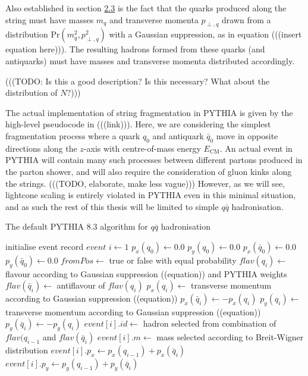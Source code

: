 \documentclass[12pt,a4paper]{report}
\begin{document}
Also established in section \hyperref[sec:lsm]{2.3} is the fact that the quarks produced along the string must have masses $m_q$ and transverse momenta $p_{\perp,q}$ drawn from a distribution $\text{Pr}(m_q^2, p_{\perp,q}^2)$ with a Gaussian suppression, as in equation (((insert equation here))). The resulting hadrons formed from these quarks (and antiquarks) must have masses and transverse momenta distributed accordingly.

(((TODO: Is this a good description? Is this necessary? What about the distribution of $N$?)))

The actual implementation of string fragmentation in PYTHIA is given by the high-level pseudocode in (((link))). Here, we are considering the simplest fragmentation process where a quark $q_0$ and antiquark $\bar{q}_0$ move in opposite directions along the $z$-axis with centre-of-mass energy $E_\text{CM}$. An actual event in PYTHIA will contain many such processes between different partons produced in the parton shower, and will also require the consideration of gluon kinks along the strings. (((TODO, elaborate, make less vague))) However, as we will see, lightcone scaling is entirely violated in PYTHIA even in this minimal situation, and as such the rest of this thesis will be limited to simple $q \bar{q}$ hadronisation.

\begin{algorithm}
  \caption{The default PYTHIA 8.3 algorithm for $q\bar{q}$ hadronisation} \label{alg:default}
  \begin{algorithmic}
    \State initialise event record $event$
    \State $i \gets 1$
    \State $p_x(q_0) \gets 0.0$
    \State $p_y(q_0) \gets 0.0$
    \State $p_x(\bar{q}_0) \gets 0.0$
    \State $p_y(\bar{q}_0) \gets 0.0$
    \Loop
    \State $fromPos \gets$ true or false with equal probability
    \State $flav(q_i) \gets$ flavour according to Gaussian suppression ((equation)) and PYTHIA weights
    \State $flav(\bar{q}_i) \gets$ antiflavour of $flav(q_i)$
    \State $p_x(q_i) \gets$ transverse momentum according to Gaussian suppression ((equation))
    \State $p_x(\bar{q}_i) \gets -p_x(q_i)$
    \State $p_y(q_i) \gets$ transverse momentum according to Gaussian suppression ((equation))
    \State $p_y(\bar{q}_i) \gets -p_y(q_i)$ 
    \State $event[i].id \gets$ hadron selected from combination of $flav(q_{i-1}$ and $flav(\bar{q}_i)$
    \State $event[i].m \gets$ mass selected according to Breit-Wigner distribution
    \State $event[i].p_x \gets p_x(q_{i-1}) + p_x(\bar{q}_i)$
    \State $event[i].p_y \gets p_y(q_{i-1}) + p_y(\bar{q}_i)$
    \Else
    \EndIf
    \EndLoop
    \EndProcedure
  \end{algorithmic}
\end{algorithm}
\end{document}
